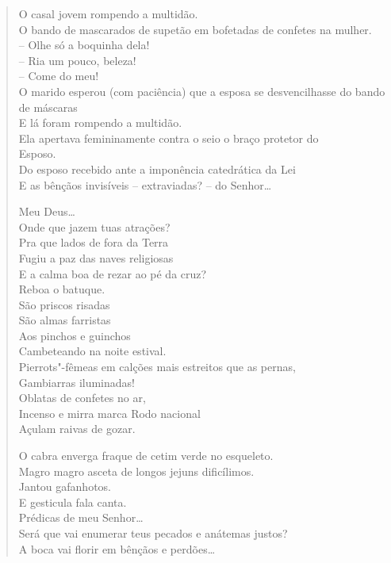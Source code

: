 \begin{verse}
O casal jovem rompendo a multidão.\\
O bando de mascarados de supetão em bofetadas de confetes na mulher.\\
-- Olhe só a boquinha dela!\\
-- Ria um pouco, beleza!\\
-- Come do meu!\\
O marido esperou (com paciência) que a esposa se desvencilhasse do bando de máscaras\\
E lá foram rompendo a multidão.\\
Ela apertava femininamente contra o seio o braço protetor do\\
Esposo.\\
Do esposo recebido ante a imponência catedrática da Lei\\
E as bênçãos invisíveis -- extraviadas? -- do Senhor\ldots{}

Meu Deus\ldots{}\\
Onde que jazem tuas atrações?\\
Pra que lados de fora da Terra\\
Fugiu a paz das naves religiosas\\
E a calma boa de rezar ao pé da cruz?\\
Reboa o batuque.\\
São priscos risadas\\
São almas farristas\\
Aos pinchos e guinchos\\
Cambeteando na noite estival.\\
Pierrots"-fêmeas em calções mais estreitos que as pernas,\\
\qquad{}Gambiarras iluminadas!\\
Oblatas de confetes no ar,\\
Incenso e mirra marca Rodo nacional\\
Açulam raivas de gozar.

O cabra enverga fraque de cetim verde no esqueleto.\\
Magro magro asceta de longos jejuns dificílimos.\\
Jantou gafanhotos.\\
E gesticula fala canta.\\
Prédicas de meu Senhor\ldots{}\\
Será que vai enumerar teus pecados e anátemas justos?\\
A boca vai florir em bênçãos e perdões\ldots{}


\end{verse}
